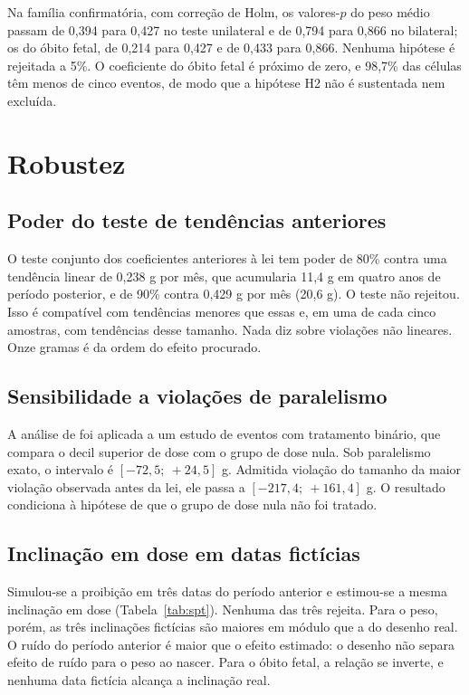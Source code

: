 Na família confirmatória, com correção de Holm, os valores-$p$ do peso médio
passam de 0,394 para 0,427 no teste unilateral e de 0,794 para 0,866 no
bilateral; os do óbito fetal, de 0,214 para 0,427 e de 0,433 para 0,866.
Nenhuma hipótese é rejeitada a 5\%. O coeficiente do óbito fetal é próximo de
zero, e 98,7\% das células têm menos de cinco eventos, de modo que a hipótese
H2 não é sustentada nem excluída.

\section{Robustez}
\label{sec:res-robustez}

\subsection{Poder do teste de tendências anteriores}

O teste conjunto dos coeficientes anteriores à lei tem poder de 80\% contra uma
tendência linear de 0,238 g por mês, que acumularia 11,4 g em quatro anos de
período posterior, e de 90\% contra 0,429 g por mês (20,6 g). O teste não
rejeitou. Isso é compatível com tendências menores que essas e, em uma de cada
cinco amostras, com tendências desse tamanho. Nada diz sobre violações não
lineares. Onze gramas é da ordem do efeito procurado.

\subsection{Sensibilidade a violações de paralelismo}

A análise de \citet{rambachan2023credible} foi aplicada a um estudo de eventos
com tratamento binário, que compara o decil superior de dose com o grupo de
dose nula. Sob paralelismo exato, o intervalo é $[-72{,}5;\ +24{,}5]$ g.
Admitida violação do tamanho da maior violação observada antes da lei, ele
passa a $[-217{,}4;\ +161{,}4]$ g. O resultado condiciona à hipótese de que o
grupo de dose nula não foi tratado.

\subsection{Inclinação em dose em datas fictícias}

Simulou-se a proibição em três datas do período anterior e estimou-se a mesma
inclinação em dose (Tabela~\ref{tab:spt}). Nenhuma das três rejeita. Para o
peso, porém, as três inclinações fictícias são maiores em módulo que a do
desenho real. O ruído do período anterior é maior que o efeito estimado: o
desenho não separa efeito de ruído para o peso ao nascer. Para o óbito fetal, a
relação se inverte, e nenhuma data fictícia alcança a inclinação real.

